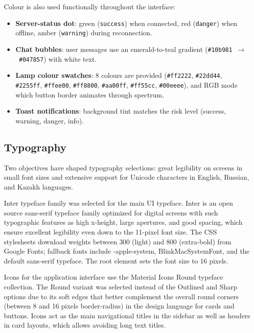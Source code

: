 Colour is also used functionally throughout the interface:

\begin{itemize}
    \item \textbf{Server-status dot}: green (\texttt{success}) when connected, red (\texttt{danger}) when offline, amber (\texttt{warning}) during reconnection.
    \item \textbf{Chat bubbles}: user messages use an emerald-to-teal gradient (\texttt{\#10b981}~$\to$~\texttt{\#047857}) with white text.
    \item \textbf{Lamp colour swatches}: 8 colours are provided (\texttt{\#ff2222}, \texttt{\#22dd44}, \texttt{\#2255ff}, \texttt{\#ffee00}, \texttt{\#ff8800}, \texttt{\#aa00ff}, \texttt{\#ff55cc}, \texttt{\#00eeee}), and RGB mode which button border animates through spectrum.
    \item \textbf{Toast notifications}: background tint matches the risk level (success, warning, danger, info).
\end{itemize}


\subsection{Typography}

Two objectives have shaped typography selections: great legibility on screens in small font sizes and extensive support for Unicode characters in English, Russian, and Kazakh languages.

Inter typeface family was selected for the main UI typeface. Inter is an open source sans-serif typeface family optimized for digital screens with such typographic features as high x-height, large apertures, and good spacing, which ensure excellent legibility even down to the 11-pixel font size. The CSS stylesheets download weights between 300 (light) and 800 (extra-bold) from Google Fonts; fallback fonts include -apple-system, BlinkMacSystemFont, and the default sans-serif typeface. The root element sets the font size to 16 pixels.

Icons for the application interface use the Material Icons Round typeface collection. The Round variant was selected instead of the Outlined and Sharp options due to its soft edges that better complement the overall round corners (between 8 and 16 pixels border-radius) in the design language for cards and buttons. Icons act as the main navigational titles in the sidebar as well as headers in card layouts, which allows avoiding long text titles.

